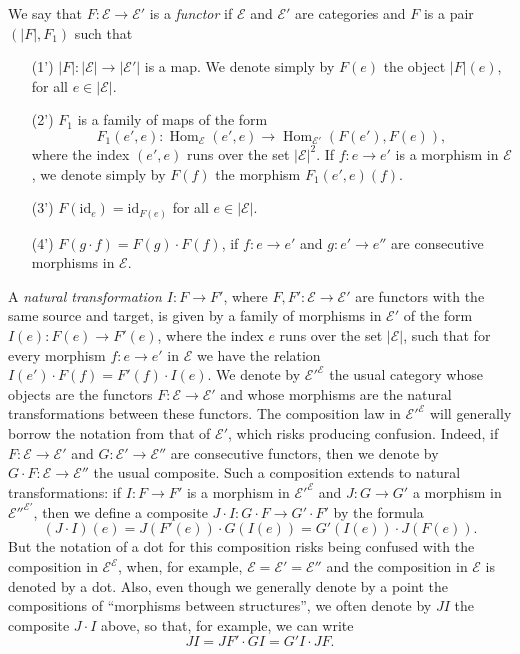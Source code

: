 \documentclass[fleqn]{article}
\newcommand{\oldpage}[1]{\marginpar{\footnotesize$\Big\vert$ \textit{p.~#1}}}
\newcommand{\id}{\mathrm{id}}
\newcommand{\cat}[1]{\mathcal{#1}}
\newcommand{\set}[1]{|#1|}
\DeclareMathOperator{\Hom}{Hom}
\begin{document}
We say that $F\colon\cat{E}\to\cat{E}'$ is a \emph{functor} if $\cat{E}$ and $\cat{E}'$ are categories and $F$ is a pair $(\set{F},F_1)$ such that

\begin{enumerate}
  \item[(1')] $\set{F}\colon\set{\cat{E}}\to\set{\cat{E}'}$ is a map.
    We denote simply by $F(e)$ the object $\set{F}(e)$, for all $e\in\set{\cat{E}}$.

  \item[(2')] $F_1$ is a family of maps of the form
    \[
      F_1(e',e)\colon
      \Hom_\cat{E}(e',e)
      \to \Hom_{\cat{E}'}(F(e'),F(e)),
    \]
    where the index $(e',e)$ runs over the set $\set{\cat{E}}^2$.
    If $f\colon e\to e'$ is a morphism in $\cat{E}$, we denote simply by $F(f)$ the morphism $F_1(e',e)(f)$.

  \item[(3')] $F(\id_e)=\id_{F(e)}$ for all $e\in\set{\cat{E}}$.

  \item[(4')] $F(g\cdot f)=F(g)\cdot F(f)$, if $f\colon e\to e'$ and $g\colon e'\to e''$ are consecutive morphisms in $\cat{E}$.
\end{enumerate}

A \emph{natural transformation $I\colon F\to F'$}, where $F,F'\colon\cat{E}\to\cat{E}'$ are functors with the same source and target, is given by a family of morphisms in $\cat{E}'$ of the form $I(e)\colon F(e)\to F'(e)$, where the index $e$ runs over the set $\set{\cat{E}}$, such that for every morphism $f\colon e\to e'$ in $\cat{E}$ we have the relation $I(e')\cdot F(f)=F'(f)\cdot I(e)$.
\oldpage{221}
We denote by $\cat{E}'^{\cat{E}}$ the usual category whose objects are the functors $F\colon\cat{E}\to\cat{E}'$ and whose morphisms are the natural transformations between these functors.
The composition law in $\cat{E}'^{\cat{E}}$ will generally borrow the notation from that of $\cat{E}'$, which risks producing confusion.
Indeed, if $F\colon\cat{E}\to\cat{E}'$ and $G\colon\cat{E}'\to\cat{E}''$ are consecutive functors, then we denote by $G\cdot F\colon\cat{E}\to\cat{E}''$ the usual composite.
Such a composition extends to natural transformations: if $I\colon F\to F'$ is a morphism in $\cat{E}'^{\cat{E}}$ and $J\colon G\to G'$ a morphism in $\cat{E}''^{\cat{E}'}$, then we define a composite $J\cdot I\colon G\cdot F\to G'\cdot F'$ by the formula
\[
  (J\cdot I)(e)
  = J(F'(e))\cdot G(I(e))
  = G'(I(e))\cdot J(F(e)).
\]
But the notation of a dot for this composition risks being confused with the composition in $\cat{E}^\cat{E}$, when, for example, $\cat{E}=\cat{E}'=\cat{E}''$ and the composition in $\cat{E}$ is denoted by a dot.
Also, even though we generally denote by a point the compositions of ``morphisms between structures'', we often denote by $JI$ the composite $J\cdot I$ above, so that, for example, we can write
\[
  JI
  = JF'\cdot GI
  = G'I\cdot JF.
\]
\end{document}

